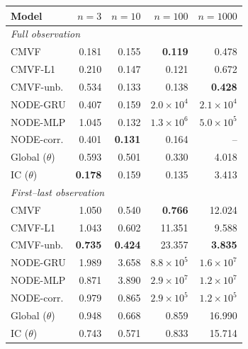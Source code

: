 \begin{tabular}{lrrrr}
\toprule
Model & $n{=}3$ & $n{=}10$ & $n{=}100$ & $n{=}1000$ \\
\midrule
\multicolumn{5}{l}{\emph{Full observation}} \\
CMVF & 0.181 & 0.155 & \textbf{0.119} & 0.478 \\
CMVF-L1 & 0.210 & 0.147 & 0.121 & 0.672 \\
CMVF-unb. & 0.534 & 0.133 & 0.138 & \textbf{0.428} \\
NODE-GRU & 0.407 & 0.159 & $2.0\!\times\!10^{4}$ & $2.1\!\times\!10^{4}$ \\
NODE-MLP & 1.045 & 0.132 & $1.3\!\times\!10^{6}$ & $5.0\!\times\!10^{5}$ \\
NODE-corr. & 0.401 & \textbf{0.131} & 0.164 & -- \\
Global ($\theta$) & 0.593 & 0.501 & 0.330 & 4.018 \\
IC ($\theta$) & \textbf{0.178} & 0.159 & 0.135 & 3.413 \\
\midrule
\multicolumn{5}{l}{\emph{First--last observation}} \\
CMVF & 1.050 & 0.540 & \textbf{0.766} & 12.024 \\
CMVF-L1 & 1.043 & 0.602 & 11.351 & 9.588 \\
CMVF-unb. & \textbf{0.735} & \textbf{0.424} & 23.357 & \textbf{3.835} \\
NODE-GRU & 1.989 & 3.658 & $8.8\!\times\!10^{5}$ & $1.6\!\times\!10^{7}$ \\
NODE-MLP & 0.871 & 3.890 & $2.9\!\times\!10^{7}$ & $1.2\!\times\!10^{7}$ \\
NODE-corr. & 0.979 & 0.865 & $2.9\!\times\!10^{5}$ & $1.2\!\times\!10^{5}$ \\
Global ($\theta$) & 0.948 & 0.668 & 0.859 & 16.990 \\
IC ($\theta$) & 0.743 & 0.571 & 0.833 & 15.714 \\
\bottomrule
\end{tabular}
